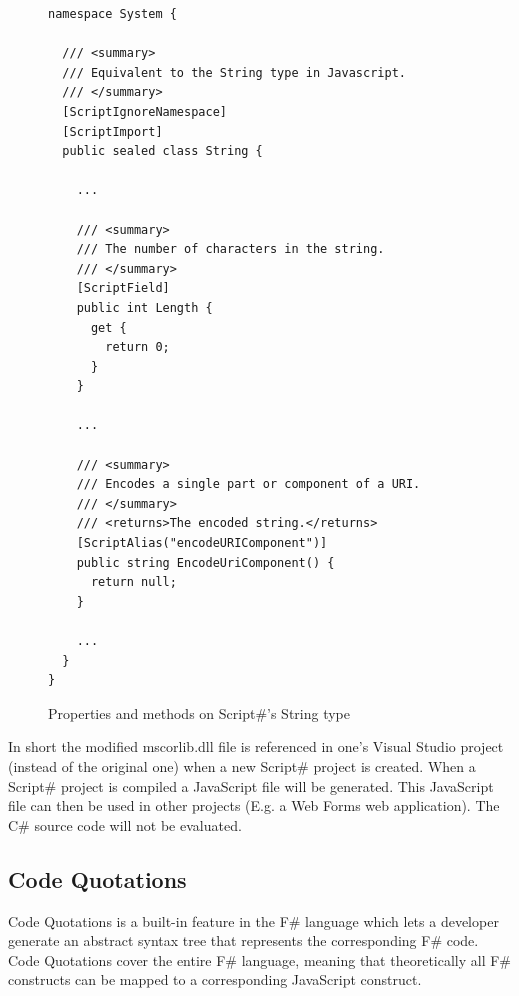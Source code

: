 		\begin{figure}
		\label{fig:scriptsharp_net_types}
			\begin{lstlisting}[language=CSharp,classoffset=1,morekeywords={String}]
namespace System {

  /// <summary>
  /// Equivalent to the String type in Javascript.
  /// </summary>
  [ScriptIgnoreNamespace]
  [ScriptImport]
  public sealed class String {

    ...

    /// <summary>
    /// The number of characters in the string.
    /// </summary>
    [ScriptField]
    public int Length {
      get {
        return 0;
      }
    }

    ...

    /// <summary>
    /// Encodes a single part or component of a URI.
    /// </summary>
    /// <returns>The encoded string.</returns>
    [ScriptAlias("encodeURIComponent")]
    public string EncodeUriComponent() {
      return null;
    }

    ...
  }
}

			\end{lstlisting}
			\caption{Properties and methods on Script\#'s String type}
		\end{figure}

		In short the modified mscorlib.dll file is referenced in one's Visual Studio project (instead of the original one) when a new Script\# project is created. When a Script\# project is compiled a JavaScript file will be generated. This JavaScript file can then be used in other projects (E.g. a Web Forms web application). The C\# source code will not be evaluated.




	\subsection{Code Quotations} %
	\label{ssub:code_quotations}
		Code Quotations is a built-in feature in the F\# language which lets a developer generate an abstract syntax tree that represents the corresponding F\# code. Code Quotations cover the entire F\# language, meaning that theoretically all F\# constructs can be mapped to a corresponding JavaScript construct.


